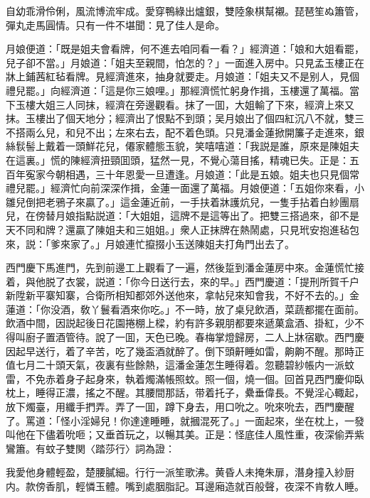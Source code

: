 自幼乖滑伶俐，風流博流牢成。愛穿鴨綠出爐銀，雙陸象棋幫襯。琵琶笙ぬ簫管，彈丸走馬圓情。只有一件不堪聞：見了佳人是命。

月娘便道：「既是姐夫會看牌，何不進去咱同看一看？」經濟道：「娘和大姐看罷，兒子卻不當。」月娘道：「姐夫至親間，怕怎的？」一面進入房中。只見孟玉樓正在牀上鋪茜紅毡看牌。見經濟進來，抽身就要走。月娘道：「姐夫又不是别人，見個禮兒罷。」向經濟道：「這是你三娘哩。」那經濟慌忙躬身作揖，玉樓還了萬福。當下玉樓大姐三人同抹，經濟在旁邊觀看。抹了一囬，大姐輸了下來，經濟上來又抹。玉樓出了個天地分；經濟出了恨點不到頭；吴月娘出了個四紅沉八不就，雙三不搭兩么兒，和兒不出；左來右去，配不着色頭。只見潘金蓮掀開簾子走進來，銀絲䯼髻上戴着一頭鮮花兒，僊家體態玉貌，笑嘻嘻道：「我説是誰，原來是陳姐夫在這裏。」慌的陳經濟扭頸囬頭，猛然一見，不覺心蕩目搖，精魂已失。正是：五百年寃家今朝相遇，三十年恩愛一旦遭逢。月娘道：「此是五娘。姐夫也只見個常禮兒罷。」經濟忙向前深深作揖，金蓮一面還了萬福。月娘便道：「五姐你來看，小雛兒倒把老鴉子來贏了。」這金蓮近前，一手扶着牀護炕兒，一隻手拈着白紗團扇兒，在傍替月娘指點説道：「大姐姐，這牌不是這等出了。把雙三搭過來，卻不是天不同和牌？還贏了陳姐夫和三姐姐。」衆人正抹牌在熱鬧處，只見玳安抱進毡包來，説：「爹來家了。」月娘連忙攛掇小玉送陳姐夫打角門出去了。

西門慶下馬進門，先到前邊工上觀看了一遍，然後踅到潘金蓮房中來。金蓮慌忙接着，與他脱了衣裳，説道：「你今日送行去，來的早。」西門慶道：「提刑所賀千户新陞新平寨知寨，合衛所相知都郊外送他來，拿帖兒來知會我，不好不去的。」金蓮道：「你没酒，敎丫鬟看酒來你吃。」不一時，放了桌兒飲酒，菜蔬都擺在面前。飲酒中間，因説起後日花園捲棚上樑，約有許多親朋都要來遞菓盒酒、掛紅，少不得叫廚子置酒管待。說了一囬，天色已晚。春梅掌燈歸房，二人上牀宿歇。西門慶因起早送行，着了辛苦，吃了幾盃酒就醉了。倒下頭鼾睡如雷，齁齁不醒。那時正值七月二十頭天氣，夜裏有些餘熱，這潘金蓮怎生睡得着。忽聽碧紗帳内一派蚊雷，不免赤着身子起身來，執着燭滿帳照蚊。照一個，燒一個。回首見西門慶仰臥枕上，睡得正濃，搖之不醒。其腰間那話，带着托子，纍垂偉長。不覺淫心輙起，放下燭臺，用纖手捫弄。弄了一囬，蹲下身去，用口吮之。吮來吮去，西門慶醒了。罵道：「怪小淫婦兒！你達達睡睡，就摑混死了。」一面起來，坐在枕上，一發叫他在下儘着吮咂；又垂首玩之，以暢其美。正是：怪底佳人風性重，夜深偷弄紫鸞簫。有蚊子雙関〈踏莎行〉詞為證：

我愛他身體輕盈，楚腰膩細。行行一派笙歌沸。黄昏人未掩朱扉，潛身撞入紗厨内。款傍香肌，輕憐玉體。嘴到處胭脂記。耳邊廂造就百般聲，夜深不肯敎人睡。

